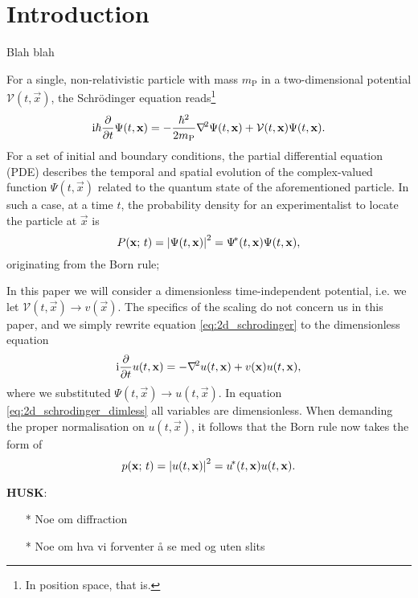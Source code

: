 \section{Introduction}\label{sec:introduction}


Blah blah 





For a single, non-relativistic particle with mass $m_\mathrm{P}$ in a two-dimensional potential $\mathcal{V}(t, \vec{x})$, the Schrödinger equation reads\footnote{In position space, that is. }
\begin{equation}\label{eq:2d_schrodinger}
    \mathrm{i} \hbar \pdv{}{t}\Psi(t, \mathbf{x}) = -\frac{\hbar^2}{2m_\mathrm{P}}\nabla^{\!2} \Psi(t, \mathbf{x})  + \mathcal{V}(t, \mathbf{x}) \Psi(t, \mathbf{x}).
\end{equation}
For a set of initial and boundary conditions, the partial differential equation (PDE) describes the temporal and spatial evolution of the complex-valued function $\Psi(t, \vec{x})$ related to the quantum state of the aforementioned particle. In such a case, at a time $t$, the probability density for an experimentalist to locate the particle at $\vec{x}$  is 
\begin{equation}\label{eq:2d_bornrule}
    P(\mathbf{x}; \, t) = \abs{\Psi(t, \mathbf{x})}^2 = \Psi^{\!*}(t, \mathbf{x}) \Psi(t, \mathbf{x}),
\end{equation} 
originating from the Born rule; 

In this paper we will consider a dimensionless time-independent potential, i.e. we let $\mathcal{V}(t, \vec{x}) \to v(\vec{x})$. The specifics of the scaling do not concern us in this paper, and we simply rewrite equation \eqref{eq:2d_schrodinger} to the dimensionless equation
\begin{equation}\label{eq:2d_schrodinger_dimless}
    \mathrm{i} \pdv{}{t}u(t, \mathbf{x}) = - \nabla^{\!2}u(t, \mathbf{x})+ v(\mathbf{x})u(t, \mathbf{x}),
\end{equation}
where we substituted $\Psi(t, \vec{x}) \to u(t, \vec{x})$. In equation \eqref{eq:2d_schrodinger_dimless} all variables are dimensionless. When demanding the proper normalisation on $u(t,\vec{x})$, it follows that the Born rule now takes the form of
\begin{equation}\label{eq:2d_bornrule_dimless}
    p(\mathbf{x}; \, t) = \abs{u(t, \mathbf{x})}^2 = u^{\!*} (t, \mathbf{x})u(t, \mathbf{x}).
\end{equation}




\textbf{HUSK}:
\begin{enumerate}
    \item[*] Noe om diffraction
    \item[*] Noe om hva vi forventer å se med og uten slits
\end{enumerate}









